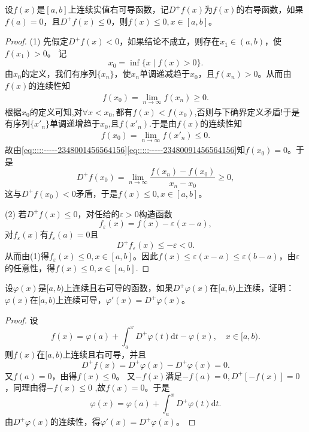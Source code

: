 \documentclass[../../main.tex]{subfiles}%
\begin{document}
\begin{proposition}\label{proposition:右导数小于等于0函数值小于端点值}
设\( f(x) \)是\([a,b]\)上连续实值右可导函数，记\( D^+f(x) \)为\( f(x) \)的右导函数，如果\( f(a)=0 \)，且\( D^+f(x) \leqslant0 \)，则\( f(x) \leqslant0, x \in [a,b] \)。
\end{proposition}
\begin{proof}

(1) 先假定\( D^+f(x) < 0 \)，如果结论不成立，则存在\( x_1 \in (a,b) \)，使\( f(x_1) > 0 \)。
记
\[
x_0 = \inf\{ x \mid f(x) > 0 \}.
\]
由\( x_0 \)的定义，我们有序列\(\{ x_n \}\)，使\( x_n \)单调递减趋于\( x_0 \)，且\( f(x_n) > 0 \)。从而由\( f(x) \)的连续性知
\begin{align}
f\left( x_0 \right)=\underset{n\rightarrow \infty}{\lim}f\left( x_n \right) \geqslant 0.\label{eq:::::-----2348001456564156}
\end{align}
根据$x_0$的定义可知,对$\forall x<x_0,$都有$f(x)<f(x_0)$,否则与下确界定义矛盾!于是有序列$\{x'_n\}$单调递增趋于$x_0$,且$f(x'_n).$于是由\( f(x) \)的连续性知
\begin{align}
f\left( x_0 \right)=\underset{n\rightarrow \infty}{\lim}f\left( x'_n \right)  \leqslant 0.\label{eq:::::-----23480091456564156}
\end{align}
故由\eqref{eq:::::-----2348001456564156}\eqref{eq:::::-----23480091456564156}知\( f(x_0)=0 \)。于是
\[
D^+f(x_0) = \lim_{n \to \infty} \frac{f(x_n) - f(x_0)}{x_n - x_0} \geqslant 0,
\]
这与\( D^+f(x_0) < 0 \)矛盾，于是\( f(x) \leqslant 0, x \in [a,b] \)。

(2) 若\( D^+f(x) \leqslant 0 \)，对任给的\( \varepsilon > 0 \)构造函数
\[
f_\varepsilon(x) = f(x) - \varepsilon(x - a),
\]
对\( f_\varepsilon(x) \)有\( f_\varepsilon(a)=0 \)且
\[
D^+f_\varepsilon(x) \leqslant-\varepsilon < 0.
\]
从而由(1)得\( f_\varepsilon(x) \leqslant0, x \in [a,b] \)。因此\( f(x) \leqslant\varepsilon(x - a)\leqslant \varepsilon (b-a) \)，由\( \varepsilon \)的任意性，得\( f(x) \leqslant0, x \in [a,b] \).

\end{proof}

\begin{example}
设\( \varphi(x) \)是\([a,b)\)上连续且右可导的函数，如果\( D^+\varphi(x) \)在\([a,b)\)上连续，证明：\( \varphi(x) \)在\([a,b)\)上连续可导，\( \varphi'(x)=D^+\varphi(x) \)。
\end{example}
\begin{proof}

设
\[
f(x) = \varphi(a) + \int_a^x D^+\varphi(t)\mathrm{d}t - \varphi(x), \quad x \in [a,b).
\]
则\( f(x) \)在\([a,b)\)上连续且右可导，并且
\[
D^+f(x) = D^+\varphi(x) - D^+\varphi(x) = 0.
\]
又\( f(a)=0 \)，由得\( f(x) \leqslant0 \)。
又\(-f(x)\)满足\(-f(a)=0, D^+[-f(x)] = 0\)，同理由得\(-f(x) \leqslant0\) ,故\(f(x)=0\)。于是
\[
\varphi(x) = \varphi(a) + \int_a^x D^+\varphi(t)\mathrm{d}t.
\]
由\( D^+\varphi(x) \)的连续性，得\( \varphi'(x)=D^+\varphi(x) \)。

\end{proof}
\end{document}
